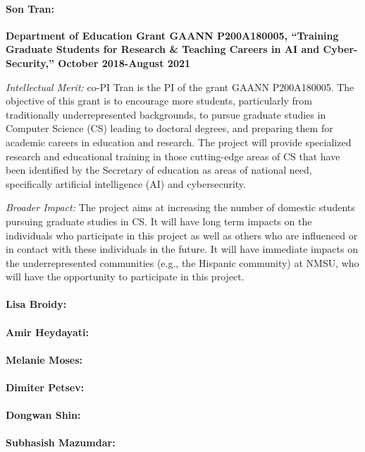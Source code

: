 \paragraph{Son Tran:}
\textbf{Department of Education Grant GAANN P200A180005, ``Training Graduate Students for Research \& Teaching Careers in AI and Cyber-Security,'' October 2018-August 2021}

\noindent \textit{Intellectual Merit:} co-PI Tran is the PI of the grant GAANN P200A180005. The objective of this grant is to encourage more students, particularly from traditionally underrepresented backgrounds, to pursue graduate studies in Computer Science (CS) leading to doctoral degrees, and preparing them for academic careers in education and research. The project will provide specialized research and educational training in those cutting-edge areas of CS that have been identified by the Secretary of education as areas of national need, specifically artificial intelligence (AI) and cybersecurity. 

\noindent \textit{Broader Impact:} The project aims at increasing the number of domestic students pursuing graduate studies in CS. It will have long term impacts on the individuals who participate in this project as well as others who are influenced or in contact with these individuals in the future. It will have immediate impacts on the underrepresented communities (e.g., the Hispanic community) at NMSU, who will have the opportunity to participate in this project.  

\paragraph{Lisa Broidy:}
\paragraph{Amir Heydayati:}
\paragraph{Melanie Moses:}
\paragraph{Dimiter Petsev:}
\paragraph{Dongwan Shin:}
\paragraph{Subhasish Mazumdar:}
